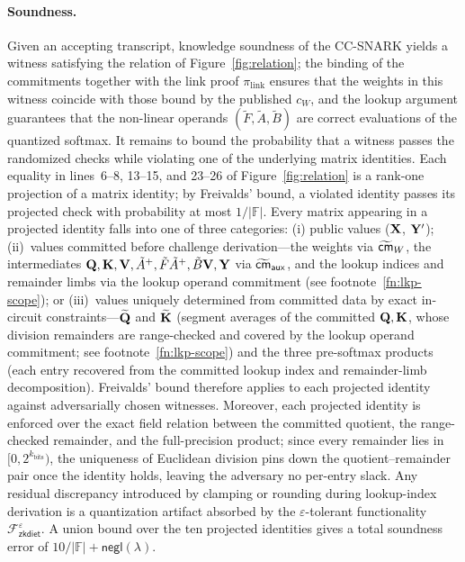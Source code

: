 \documentclass[runningheads]{llncs}
\begin{document}
\paragraph{Soundness.}
Given an accepting transcript, knowledge soundness of the CC-SNARK yields a witness satisfying the relation of Figure~\ref{fig:relation}; the binding of the commitments together with the link proof $\pi_{\mathrm{link}}$ ensures that the weights in this witness coincide with those bound by the published $c_W$, and the lookup argument guarantees that the non-linear operands $(\tilde{F},\tilde{A},\tilde{B})$ are correct evaluations of the quantized softmax. It remains to bound the probability that a witness
passes the randomized checks while violating one of the underlying matrix identities. Each equality in lines~6--8, 13--15, and 23--26 of Figure~\ref{fig:relation} is a rank-one projection of a matrix identity; by Freivalds' bound, a violated identity passes its projected check with probability at most $1/|\mathbb{F}|$. Every matrix appearing in a projected identity falls into one of three categories: (i) public values (${\mathbf{X}}$, ${\mathbf{Y}}'$); (ii)~values committed before challenge derivation---the weights via $\widetilde{{\sf cm}}_{W}$, the intermediates ${\mathbf{Q}}, {\mathbf{K}}, {\mathbf{V}}, \tilde{A}^{+}, \tilde{F}\tilde{A}^{+}, \tilde{B}{\mathbf{V}}, {\mathbf{Y}}$ via $\widetilde{{\sf cm}}_{\mathsf{aux}}$, and the lookup indices and remainder limbs via the lookup operand commitment (see footnote~\ref{fn:lkp-scope}); or (iii)~values uniquely determined from committed data by exact in-circuit constraints---$\widetilde{{\mathbf{Q}}}$ and $\widetilde{{\mathbf{K}}}$ (segment averages of the committed ${\mathbf{Q}}, {\mathbf{K}}$, whose division remainders are range-checked and covered by the lookup operand commitment; see footnote~\ref{fn:lkp-scope}) and the three pre-softmax products (each entry recovered from the committed lookup index and remainder-limb decomposition). Freivalds' bound therefore applies to each projected identity against adversarially chosen witnesses. Moreover, each projected identity is enforced over the exact field relation between the committed quotient, the range-checked remainder, and the full-precision product; since every remainder lies in $[0, 2^{k_{\text{bits}}})$, the uniqueness of Euclidean division pins down the quotient--remainder pair once the identity holds, leaving the adversary no per-entry slack. Any residual discrepancy introduced by clamping or rounding during lookup-index derivation is a quantization artifact absorbed by the $\varepsilon$-tolerant functionality $\mathcal{F}^{\varepsilon}_{\mathsf{zkdiet}}$. A union bound over the ten projected identities gives a total soundness error of $10/|\mathbb{F}| + \mathsf{negl}(\lambda)$.
\end{document}
